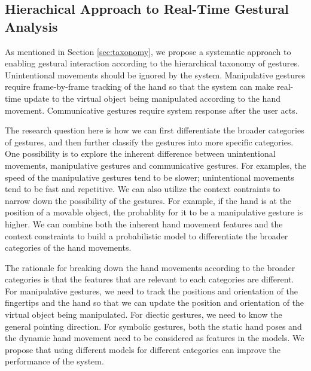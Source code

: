 \subsection{Hierachical Approach to Real-Time Gestural Analysis}
As mentioned in Section \ref{sec:taxonomy}, we propose a systematic approach to
enabling gestural interaction according to the hierarchical taxonomy of
gestures. Unintentional movements should be ignored by the system.
Manipulative gestures require frame-by-frame tracking of the hand so that the
system can make real-time update to the virtual object being manipulated according to the hand
movement. Communicative gestures require system response after the user acts.

The research question here is how we can first differentiate the broader
categories of gestures, and then further classify the gestures into more 
specific categories. One possibility is to explore the inherent difference
between unintentional movements, manipulative gestures and communicative
gestures. For examples, the speed of the manipulative gestures tend to be
slower; unintentional movements tend to be fast and repetitive. We can also
utilize the context contraints to narrow down the possibility of the gestures.
For example, if the hand is at the position of a movable object, the probablity
for it to be a manipulative gesture is higher. We can combine both the inherent
hand movement features and the context constraints to build a probabilistic
model to differentiate the broader categories of the hand movements.

The rationale for breaking down the hand movements according to the broader
categories is that the features that are relevant to each categories are
different. For manipulative gestures, we need to track the positions and 
orientation of the fingertips and the hand so that we can update the position 
and orientation of the virtual object being manipulated. For diectic gestures, 
we need to know the general pointing direction. For symbolic gestures, both the 
static hand poses and the dynamic hand movement need to be considered as 
features in the models. We propose that using different models for
different categories can improve the performance of the system. 

